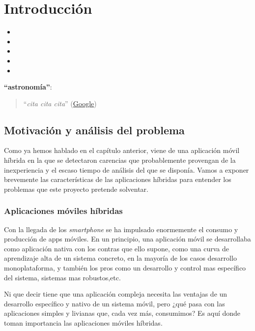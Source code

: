\chapter{Introducción}


\begin{itemize}
  \item {}
  \item \itembf
  \item \itembf
  \item \itembf
  \item \itembf
\end{itemize}

\textbf{``astronomía''}:


\begin{quote}``\textit{cita cita cita}''
\newline(\href{https://www.google.es}{Google})
\end{quote}




\section{Motivación y análisis del problema}
\bigskip
Como ya hemos hablado en el capítulo anterior, {\titulo} viene de una aplicación móvil híbrida en la que se detectaron carencias que probablemente provengan de la inexperiencia y el escaso tiempo de análisis del que se disponía. Vamos a exponer brevemente las características de las aplicaciones híbridas para entender los problemas que este proyecto pretende solventar.

\subsection{Aplicaciones móviles híbridas}
Con la llegada de los \textit{smartphone} se ha impulsado enormemente el consumo y producción de apps móviles. En un principio, una aplicación móvil se desarrollaba como aplicación nativa con los contras que ello supone, como una curva de aprendizaje alta de un sistema concreto, en la mayoría de los casos desarrollo monoplataforma, y también los pros como un desarrollo y control mas específico del sistema, sistemas mas robustos,etc.

\bigskip
Ni que decir tiene que una aplicación compleja necesita las ventajas de un desarrollo específico y nativo de un sistema móvil, pero ¿qué pasa con las aplicaciones simples y livianas que, cada vez más, consumimos? Es aquí donde toman importancia las aplicaciones móviles híbridas.

